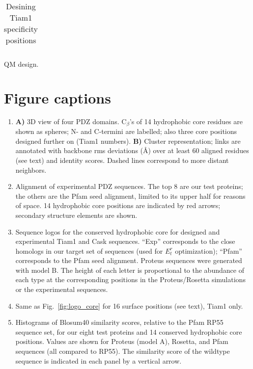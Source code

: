 \documentclass[12pt]{article}
\begin{document}
\begin{table}[h]                            
\caption{Desining Tiam1 specificity positions}
\label{tab:tiamQM}                      
\begin{center} 
\begin{tabular}{ccccccc} \hline \hline  
 \\ \hline
\end{tabular}  
\end{center} 
{\footnotesize \noindent QM design.
}
\end{table}

\clearpage
\pagebreak

\section*{Figure captions}
\begin{enumerate}
\item
{\bf A)} 3D view of four PDZ domains. C$_{\beta}$'s of 14 hydrophobic core residues are shown as spheres; N- and C-termini
are labelled; also three core positions designed further on (Tiam1 numbers).
{\bf B)} Cluster representation; links are annotated with backbone rms deviations (\AA) over at least 60 aligned residues
(see text) and identity scores. Dashed lines correspond to more distant neighbors.

\item
Alignment of experimental PDZ sequences. The top 8 are our test proteins; the others are the Pfam seed alignment, limited
to its upper half for reasons of space. 14 hydrophobic core positions are indicated by red arrows; secondary structure
elements are shown.

\item
Sequence logos for the conserved hydrophobic core for designed and experimental Tiam1 and Cask sequences. ``Exp'' corresponds to
the close homologs in our target set of sequences (used for $E_t^r$ optimization); ``Pfam'' corresponds to the Pfam seed alignment.
Proteus sequences were generated with model B. The height of each letter is proportional to the abundance of each type at the
corresponding positions in the Proteus/Rosetta simulations or the experimental sequences.

\item
Same as Fig.\ \ref{fig:logo_core} for 16 surface positions (see text), Tiam1 only.

\item
Histograms of Blosum40 similarity scores, relative to the Pfam RP55 sequence set, for our eight test proteins and
14 conserved hydrophobic core positions. Values are shown for Proteus (model A), Rosetta, and Pfam sequences (all
compared to RP55). The similarity score of the wildtype sequence is indicated in each panel by a vertical arrow.


\end{enumerate}
\end{document}
